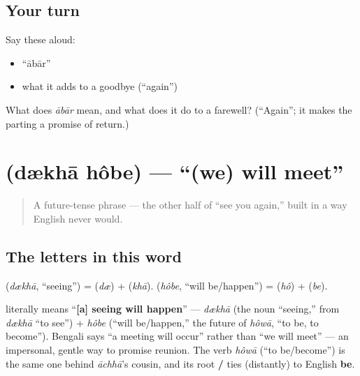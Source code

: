 \subsection*{Your turn}
Say these aloud:

\begin{itemize}
\raggedright
  \item \textquotedblleft{}ābār\textquotedblright{}
  \item what it adds to a goodbye (\textquotedblleft{}again\textquotedblright{})
\end{itemize}

\begin{tcolorbox}[breakable,colback=teal!4,colframe=teal!35!black,title={Before you move on}]
What does \emph{ābār} mean, and what does it do to a farewell? (\textquotedblleft{}Again\textquotedblright{}; it makes the parting a promise of return.)
\end{tcolorbox}
\section[\bn{দেখা} \bn{হবে}]{  (dækhā hôbe) — \textquotedblleft{}(we) will meet\textquotedblright{}}

\label{lesson:BN-C04-dekha-hobe}



\begin{quote}
A future-tense phrase — the other half of \textquotedblleft{}see you again,\textquotedblright{} built in a way English never would.
\end{quote}

\subsection*{The letters in this word}
\textbf{} (\emph{dækhā}, \textquotedblleft{}seeing\textquotedblright{}) = \textbf{} (\emph{dæ}) + \textbf{} (\emph{khā}). \textbf{} (\emph{hôbe}, \textquotedblleft{}will be/happen\textquotedblright{}) = \textbf{} (\emph{hô}) + \textbf{} (\emph{be}).

\begin{cousinweb}
\textbf{ } literally means \textquotedblleft{}\textbf{{[}a{]} seeing will happen}\textquotedblright{} — \emph{dækhā} (the noun \textquotedblleft{}seeing,\textquotedblright{} from \textbf{} \emph{dækhā} \textquotedblleft{}to see\textquotedblright{}) + \emph{hôbe} (\textquotedblleft{}will be/happen,\textquotedblright{} the future of \textbf{} \emph{hôwā}, \textquotedblleft{}to be, to become\textquotedblright{}). Bengali says \textquotedblleft{}a meeting will occur\textquotedblright{} rather than \textquotedblleft{}we will meet\textquotedblright{} — an impersonal, gentle way to promise reunion. The verb \emph{hôwā} (\textquotedblleft{}to be/become\textquotedblright{}) is the same one behind \emph{āchhā}'s cousin, and its root \textbf{ / } ties (distantly) to English \textbf{be}.
\end{cousinweb}

